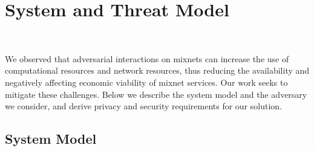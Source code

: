 \section{System and Threat Model}~\label{sec:sys_model}

We observed that adversarial interactions on mixnets can increase the use of
computational resources and network resources, thus reducing the
availability and negatively affecting economic viability of mixnet
services. Our work seeks to mitigate these challenges. Below we describe
the system model and the adversary we consider, and derive privacy and
security requirements for our solution.

\subsection{System Model}

